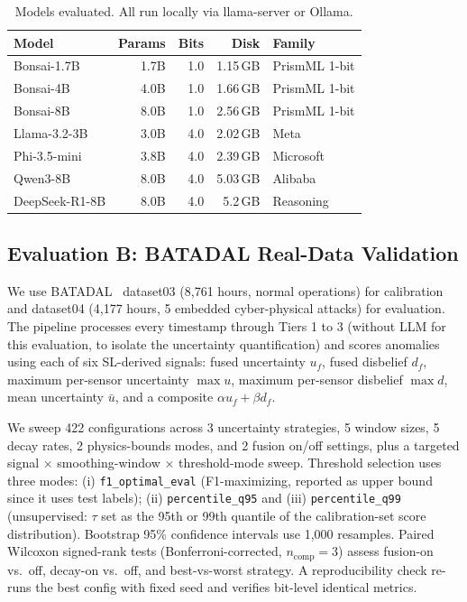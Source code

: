 \documentclass[conference]{IEEEtran}
\begin{document}
\begin{table}[t]
\centering
\caption{Models evaluated. All run locally via llama-server or Ollama.}
\label{tab:models}
\footnotesize
\begin{tabular}{@{}lrrrl@{}}
\toprule
\textbf{Model} & \textbf{Params} & \textbf{Bits} & \textbf{Disk} & \textbf{Family} \\
\midrule
Bonsai-1.7B   & 1.7B & 1.0 & 1.15\,GB & PrismML 1-bit \\
Bonsai-4B     & 4.0B & 1.0 & 1.66\,GB & PrismML 1-bit \\
Bonsai-8B     & 8.0B & 1.0 & 2.56\,GB & PrismML 1-bit \\
Llama-3.2-3B  & 3.0B & 4.0 & 2.02\,GB & Meta~\cite{dubey2024llama3} \\
Phi-3.5-mini  & 3.8B & 4.0 & 2.39\,GB & Microsoft~\cite{abdin2024phi3} \\
Qwen3-8B      & 8.0B & 4.0 & 5.03\,GB & Alibaba~\cite{yang2024qwen25} \\
DeepSeek-R1-8B& 8.0B & 4.0 & 5.2\,GB & Reasoning~\cite{deepseek2025r1} \\
\bottomrule
\end{tabular}
\end{table}

\subsection{Evaluation B: BATADAL Real-Data Validation}

We use BATADAL~\cite{taormina2018battle} dataset03 (8{,}761 hours, normal operations) for calibration and dataset04 (4{,}177 hours, 5 embedded cyber-physical attacks) for evaluation. The pipeline processes every timestamp through Tiers 1 to 3 (without LLM for this evaluation, to isolate the uncertainty quantification) and scores anomalies using each of six SL-derived signals: fused uncertainty $u_f$, fused disbelief $d_f$, maximum per-sensor uncertainty $\max u$, maximum per-sensor disbelief $\max d$, mean uncertainty $\bar{u}$, and a composite $\alpha u_f + \beta d_f$.

We sweep 422 configurations across 3 uncertainty strategies, 5 window sizes, 5 decay rates, 2 physics-bounds modes, and 2 fusion on/off settings, plus a targeted signal $\times$ smoothing-window $\times$ threshold-mode sweep. Threshold selection uses three modes: (i) \texttt{f1\_optimal\_eval} (F1-maximizing, reported as upper bound since it uses test labels); (ii) \texttt{percentile\_q95} and (iii) \texttt{percentile\_q99} (unsupervised: $\tau$ set as the 95th or 99th quantile of the calibration-set score distribution). Bootstrap 95\% confidence intervals use 1{,}000 resamples. Paired Wilcoxon signed-rank tests (Bonferroni-corrected, $n_{\text{comp}}=3$) assess fusion-on vs.\ off, decay-on vs.\ off, and best-vs-worst strategy. A reproducibility check re-runs the best config with fixed seed and verifies bit-level identical metrics.
\end{document}
